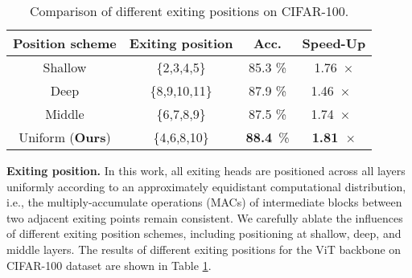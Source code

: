   \begin{table}[h]
    \centering
    \setlength{\extrarowheight}{0pt}
    \addtolength{\extrarowheight}{\aboverulesep}
    \addtolength{\extrarowheight}{\belowrulesep}
    \setlength{\aboverulesep}{0pt}
    \setlength{\belowrulesep}{0pt}
    \caption{Comparison of different exiting positions on CIFAR-100. }
    \label{tb:position}
    \vspace{-6pt}
    \begin{tabular}{cccc} 
    \toprule
    \textbf{Position scheme}                                  & \textbf{Exiting position} & \textbf{Acc.}     & \textbf{Speed-Up}       \\ 
    \hline
    Shallow                                                   & \{2,3,4,5\}               & 85.3 \%           & 1.76~$\times$           \\
    Deep                                                      & \{8,9,10,11\}             & 87.9 \%           & 1.46~$\times$~          \\
    Middle                                                    & \{6,7,8,9\}               & 87.5 \%          & 1.74~$\times$~          \\
    \rowcolor[rgb]{0.949,0.949,0.949} Uniform (\textbf{Ours}) & \{4,6,8,10\}              & \textbf{88.4}~\% & \textbf{1.81~}$\times$  \\
    \bottomrule
    \end{tabular}
    \vspace{-2pt}
    \end{table}

\textbf{Exiting position.} In this work, all exiting heads are positioned across all layers uniformly according to an approximately equidistant computational distribution, i.e., 
the multiply-accumulate operations (MACs) of intermediate blocks between two adjacent exiting points remain consistent. 
We carefully ablate the influences of different exiting position schemes, including positioning at shallow, deep, and middle layers. 
The results of different exiting positions for the ViT backbone on CIFAR-100 dataset are shown in Table \ref{tb:position}. 


